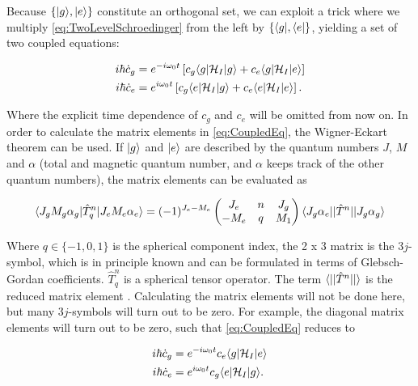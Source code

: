 Because $\{\lvert g\rangle,\lvert e\rangle\}$ constitute an orthogonal set, we can exploit a trick where we multiply \cref{eq:TwoLevelSchroedinger} from the left by $\{\langle g\rvert,\langle e\rvert\}$, yielding a set of two coupled equations:

\begin{subequations}\label{eq:CoupledEq}
	\begin{align}
		i \hbar \dot{c}_g &= e^{-i \omega_0 t} 
		\left[c_g \langle g\rvert \mathcal{H}_I \lvert g\rangle + c_e \langle g\rvert \mathcal{H}_I \lvert e\rangle\right]  \\
		i \hbar \dot{c}_e &=  e^{ i \omega_0 t} 
		\left[c_g \langle e\rvert \mathcal{H}_I \lvert g\rangle + c_e \langle e\rvert \mathcal{H}_I \lvert e\rangle\right] .
	\end{align}
\end{subequations}

Where the explicit time dependence of $c_g$ and $c_e$ will be omitted from now on. In order to calculate the matrix elements in \cref{eq:CoupledEq}, the Wigner-Eckart theorem can be used. If $\lvert g\rangle$ and $\lvert e\rangle$ are described by the quantum numbers $J$, $M$ and $\alpha$ (total and magnetic quantum number, and $\alpha$ keeps track of the other quantum numbers), the matrix elements can be evaluated as 

\begin{equation}\label{eq:WignerEckart}
	\langle J_g M_g \alpha_g\rvert \hat{T}_q^n \lvert J_e M_e \alpha_e\rangle = 
	(-1)^{J_e-M_e} \begin{pmatrix}
		J_e & n & J_g \\
		-M_e& q & M_1
	\end{pmatrix}
	\langle J_g\alpha_e \rvert | \hat{T}^n | \lvert J_g\alpha_g \rangle
\end{equation}

Where $q \in \{-1,0,1\}$ is the spherical component index, the 2 x 3 matrix is the $3j$-symbol, which is in principle known and can be formulated in terms of  Glebsch-Gordan coefficients. $\hat{T}_q^n$ is a spherical tensor operator. The term $\langle\rvert|\hat{T}^n|\lvert\rangle$ is the reduced matrix element \cite{Leeuwen2017}. Calculating the matrix elements will not be done here, but many $3j$-symbols will turn out to be zero. For example, the diagonal matrix elements will turn out to be zero, such that \cref{eq:CoupledEq} reduces to

\begin{subequations}\label{eq:NoOffDiagonal}
	\begin{align}
		i \hbar \dot{c}_g &= e^{-i \omega_0 t}  c_e \langle g\rvert \mathcal{H}_I \lvert e\rangle \\
		i \hbar \dot{c}_e &=  e^{ i \omega_0 t} c_g \langle e\rvert \mathcal{H}_I \lvert g\rangle  .
	\end{align}
\end{subequations}


